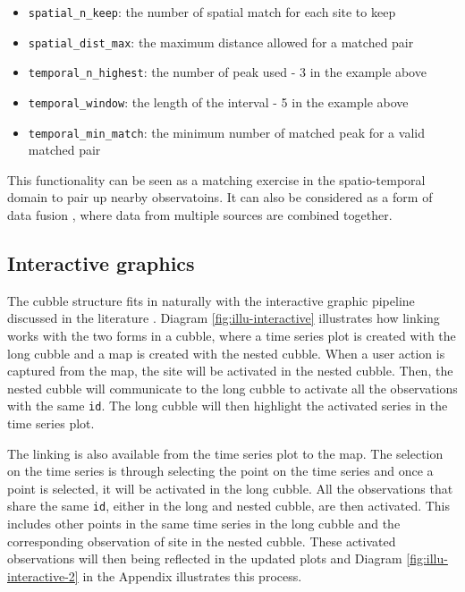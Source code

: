 \documentclass[
]{jss}
\providecommand{\tightlist}{%
  \setlength{\itemsep}{0pt}\setlength{\parskip}{0pt}}
\begin{document}
\begin{itemize}
\tightlist
\item
  \texttt{spatial\_n\_keep}: the number of spatial match for each site
  to keep
\item
  \texttt{spatial\_dist\_max}: the maximum distance allowed for a
  matched pair
\item
  \texttt{temporal\_n\_highest}: the number of peak used - 3 in the
  example above
\item
  \texttt{temporal\_window}: the length of the interval - 5 in the
  example above
\item
  \texttt{temporal\_min\_match}: the minimum number of matched peak for
  a valid matched pair
\end{itemize}

This functionality can be seen as a matching
\citep{stuart2010matching, mcintosh2018using} exercise in the
spatio-temporal domain to pair up nearby observatoins. It can also be
considered as a form of data fusion
\citep{castanedo2013review, cocchi2019data}, where data from multiple
sources are combined together.

\hypertarget{interactive-graphics}{%
\subsection{Interactive graphics}\label{interactive-graphics}}

The cubble structure fits in naturally with the interactive graphic
pipeline discussed in the literature
\citep{buja1988elements, buja1996interactive, sutherland2000orca, xie2014reactive, cheng2016enabling}.
Diagram \ref{fig:illu-interactive} illustrates how linking works with
the two forms in a cubble, where a time series plot is created with the
long cubble and a map is created with the nested cubble. When a user
action is captured from the map, the site will be activated in the
nested cubble. Then, the nested cubble will communicate to the long
cubble to activate all the observations with the same \texttt{id}. The
long cubble will then highlight the activated series in the time series
plot.

The linking is also available from the time series plot to the map. The
selection on the time series is through selecting the point on the time
series and once a point is selected, it will be activated in the long
cubble. All the observations that share the same \texttt{id}, either in
the long and nested cubble, are then activated. This includes other
points in the same time series in the long cubble and the corresponding
observation of site in the nested cubble. These activated observations
will then being reflected in the updated plots and Diagram
\ref{fig:illu-interactive-2} in the Appendix illustrates this process.
\end{document}
